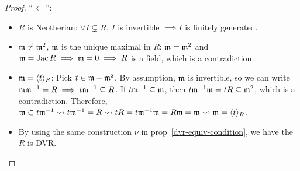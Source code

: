 \begin{prop}
\begin{enumerate}
\begin{proof}
        ``$\Leftarrow$'': \mbox{}
        \begin{itemize}
          \item $R$ is Neotherian:
            $\forall I \subsetneq R$, $I$ is invertible $\implies I$ is finitely
            generated.
          \item $\mathfrak{m} \neq \mathfrak{m}^2$, $\mathfrak{m}$ is the unique maximal in $R$:
            $\mathfrak{m} = \mathfrak{m}^2$ and $\mathfrak{m} = \operatorname{Jac} R \implies \mathfrak{m} = 0 \implies R$ is a field,
             which is a contradiction.
          \item $\mathfrak{m} = \langle t\rangle_R$:
            Pick $t \in \mathfrak{m} - \mathfrak{m}^2$. By assumption, $\mathfrak{m}$ is invertible, so we
            can write $\mathfrak{m}\mathfrak{m}^{-1} = R \implies t\mathfrak{m}^{-1} \subseteq R$.
            If $t\mathfrak{m}^{-1} \subseteq \mathfrak{m}$, then $t\mathfrak{m}^{-1}\mathfrak{m} = tR \subseteq
            \mathfrak{m}^{2}$, which is a contradiction.
            Therefore, $\mathfrak{m} \subset t\mathfrak{m}^{-1} \leadsto t\mathfrak{m}^{-1} = R \leadsto
            tR = t\mathfrak{m}^{-1}\mathfrak{m} = R\mathfrak{m} = \mathfrak{m} \leadsto \mathfrak{m} = \langle t\rangle_R$.
          \item By using the same construction $\nu$ in prop~\ref{dvr-equiv-condition},
            we have the $R$ is DVR.
            \qedhere
        \end{itemize}
      \end{proof}
  \end{enumerate}
\end{prop}

